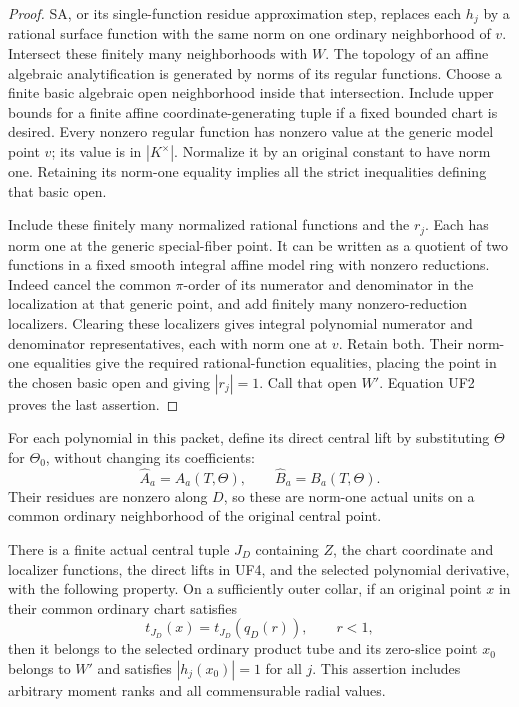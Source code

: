 \begin{proof}
SA, or its single-function residue approximation step,
replaces each \(h_j\) by a rational surface function
with the same norm on one ordinary neighborhood of
\(v\).  Intersect these finitely many neighborhoods
with \(W\).  The topology of an affine algebraic
analytification is generated by norms of its regular
functions.  Choose a finite basic algebraic open
neighborhood inside that intersection.  Include upper
bounds for a finite affine coordinate-generating tuple
if a fixed bounded chart is desired.  Every nonzero
regular function has nonzero value at the generic
model point \(v\); its value is in \(|K^\times|\).
Normalize it by an original constant to have norm
one.  Retaining its norm-one equality implies all
the strict inequalities defining that basic open.

Include these finitely many normalized rational
functions and the \(r_j\).  Each has norm one at
the generic special-fiber point.  It can be written
as a quotient of two functions in a fixed smooth
integral affine model ring with nonzero reductions.
Indeed cancel the common \(\pi\)-order of its
numerator and denominator in the localization at
that generic point, and add finitely many
nonzero-reduction localizers.  Clearing these
localizers gives integral polynomial numerator
and denominator representatives, each with norm
one at \(v\).  Retain both.  Their norm-one
equalities give the required rational-function
equalities, placing the point in the chosen basic
open and giving \(|r_j|=1\).  Call that open
\(W'\).  Equation UF2 proves the last assertion.
\end{proof}

For each polynomial in this packet, define its direct
central lift by substituting \(\Theta\) for
\(\Theta_0\), without changing its coefficients:
\[
       \widehat A_a=A_a(T,\Theta),\qquad
       \widehat B_a=B_a(T,\Theta).
\tag{UF4}
\]
Their residues are nonzero along \(D\), so these
are norm-one actual units on a common ordinary
neighborhood of the original central point.

\begin{lemma}
\label{lem:r13-entire-fiber-zero-slice}
There is a finite actual central tuple \(J_D\)
containing \(Z\), the chart coordinate and localizer
functions, the direct lifts in UF4, and the selected
polynomial derivative, with the following property.
On a sufficiently outer collar, if an original point
\(x\) in their common ordinary chart satisfies
\[
                    t_{J_D}(x)=t_{J_D}(q_D(r)),
                             \qquad r<1,
\tag{UF5}
\]
then it belongs to the selected ordinary product
tube and its zero-slice point \(x_0\) belongs to
\(W'\) and satisfies \(|h_j(x_0)|=1\) for all \(j\).
This assertion includes arbitrary moment ranks and
all commensurable radial values.
\end{lemma}

